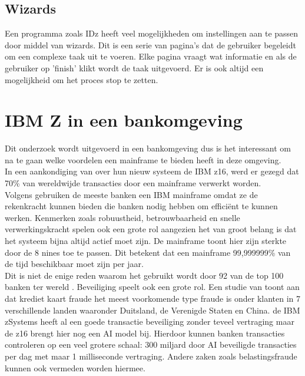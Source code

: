 \subsection{Wizards}
Een programma zoals IDz heeft veel mogelijkheden om instellingen aan te passen door middel van wizards. Dit is een serie van pagina's dat de gebruiker begeleidt om een complexe taak uit te voeren. Elke pagina vraagt wat informatie en als de gebruiker op 'finish' klikt wordt de taak uitgevoerd. Er is ook altijd een mogelijkheid om het proces stop te zetten. \autocite{Eclipse2006}

\section{IBM Z in een bankomgeving}
Dit onderzoek wordt uitgevoerd in een bankomgeving dus is het interessant om na te gaan welke voordelen een mainframe te bieden heeft in deze omgeving. \\ 

In een aankondiging van \textcite{IBM2022} over hun nieuw systeem de IBM z16, werd er gezegd dat 70\% van wereldwijde transacties door een mainframe verwerkt worden. \\

Volgens \textcite{Turner2022} gebruiken de meeste banken een IBM mainframe omdat ze de rekenkracht kunnen bieden die banken nodig hebben om efficiënt te kunnen werken. Kenmerken zoals robuustheid, betrouwbaarheid en snelle verwerkingskracht spelen ook een grote rol aangezien het van groot belang is dat het systeem bijna altijd actief moet zijn. De mainframe toont hier zijn sterkte door de 8 nines toe te passen. Dit betekent dat een mainframe 99,999999\% van de tijd beschikbaar moet zijn per jaar. \autocite{IBMa} \\

Dit is niet de enige reden waarom het gebruikt wordt door 92 van de top 100 banken ter wereld \autocite{Tozzi2022}. Beveiliging speelt ook een grote rol. Een studie van \textcite{MorningConsult2022} toont aan dat krediet kaart fraude het meest voorkomende type fraude is onder klanten in 7 verschillende landen waaronder Duitsland, de Verenigde Staten en China. de IBM zSystems heeft al een goede transactie beveiliging zonder teveel vertraging maar de z16 brengt hier nog een AI model bij. Hierdoor kunnen banken transacties controleren op een veel grotere schaal: 300 miljard door AI beveiligde transacties per dag met maar 1 milliseconde vertraging. Andere zaken zoals belastingsfraude kunnen ook vermeden worden hiermee. \autocite{IBM2022} \\

